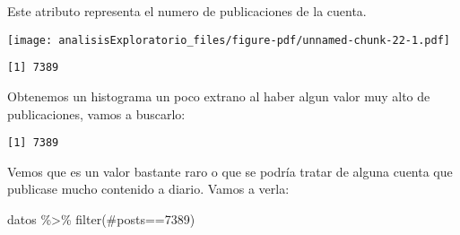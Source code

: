 \documentclass[
  letterpaper,
  DIV=11,
  numbers=noendperiod]{scrreprt}
\newenvironment{Shaded}{\begin{snugshade}}{\end{snugshade}}
\newcommand{\AttributeTok}[1]{\textcolor[rgb]{0.40,0.45,0.13}{#1}}
\newcommand{\DecValTok}[1]{\textcolor[rgb]{0.68,0.00,0.00}{#1}}
\newcommand{\FunctionTok}[1]{\textcolor[rgb]{0.28,0.35,0.67}{#1}}
\newcommand{\NormalTok}[1]{\textcolor[rgb]{0.00,0.23,0.31}{#1}}
\newcommand{\SpecialCharTok}[1]{\textcolor[rgb]{0.37,0.37,0.37}{#1}}
\newcommand{\StringTok}[1]{\textcolor[rgb]{0.13,0.47,0.30}{#1}}
\begin{document}
Este atributo representa el numero de publicaciones de la cuenta.

\begin{Shaded}
\end{Shaded}

\texttt{[image: analisisExploratorio\_files/figure-pdf/unnamed-chunk-22-1.pdf]}

\begin{Shaded}
\end{Shaded}

\begin{verbatim}
[1] 7389
\end{verbatim}

Obtenemos un histograma un poco extrano al haber algun valor muy alto de
publicaciones, vamos a buscarlo:

\begin{Shaded}
\end{Shaded}

\begin{verbatim}
[1] 7389
\end{verbatim}

Vemos que es un valor bastante raro o que se podría tratar de alguna
cuenta que publicase mucho contenido a diario. Vamos a verla:

\begin{Shaded}
\begin{Highlighting}[]
\NormalTok{datos }\SpecialCharTok{\%\textgreater{}\%} \FunctionTok{filter}\NormalTok{(}\StringTok{\textasciigrave{}}\AttributeTok{\#posts}\StringTok{\textasciigrave{}}\SpecialCharTok{==}\DecValTok{7389}\NormalTok{)}
\end{Highlighting}
\end{Shaded}
\end{document}
